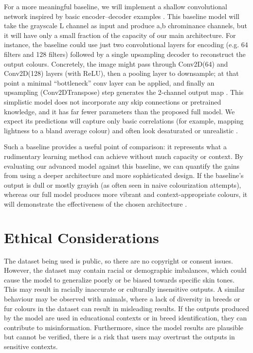 \documentclass{article} %
\begin{document}
For a more meaningful baseline, we will implement a shallow convolutional network inspired by basic encoder–decoder examples \citep{leatvanich2025image}. This baseline model will take the grayscale L channel as input and produce a,b chrominance channels, but it will have only a small fraction of the capacity of our main architecture. For instance, the baseline could use just two convolutional layers for encoding (e.g. 64 filters and 128 filters) followed by a single upsampling decoder to reconstruct the output colours. Concretely, the image might pass through Conv2D(64) and Conv2D(128) layers (with ReLU), then a pooling layer to downsample; at that point a minimal “bottleneck” conv layer can be applied, and finally an upsampling (Conv2DTranspose) step generates the 2-channel output map \citep{leatvanich2025image}. This simplistic model does not incorporate any skip connections or pretrained knowledge, and it has far fewer parameters than the proposed full model. We expect its predictions will capture only basic correlations (for example, mapping lightness to a bland average colour) and often look desaturated or unrealistic \citep{rosebrock2019bwcolorization}.

Such a baseline provides a useful point of comparison: it represents what a rudimentary learning method can achieve without much capacity or context. By evaluating our advanced model against this baseline, we can quantify the gains from using a deeper architecture and more sophisticated design. If the baseline’s output is dull or mostly grayish (as often seen in naive colourization attempts), whereas our full model produces more vibrant and context-appropriate colours, it will demonstrate the effectiveness of the chosen architecture \citep{rosebrock2019bwcolorization}.

\section{Ethical Considerations}
\label{ethical}

The dataset being used is public, so there are no copyright or consent issues. However, the dataset may contain racial or demographic imbalances, which could cause the model 
to generalize poorly or be biased towards specific skin tones. This may result in racially inaccurate or culturally insensitive outputs. A similar behaviour may be observed with 
animals, where a lack of diversity in breeds or fur colours in the dataset can result in misleading results. If the outputs produced by the model are used in educational contexts 
or in breed identification, they can contribute to misinformation. Furthermore, since the model results are plausible but cannot be verified, there is a risk that users may 
overtrust the outputs in sensitive contexts.
\end{document}
